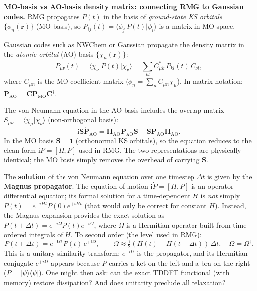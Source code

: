 \documentclass[12pt,letterpaper]{article}
\newcommand{\ii}{\mathrm{i}}
\theoremstyle{definition}
\begin{document}
\begin{insight}
\textbf{MO-basis vs AO-basis density matrix: connecting RMG to Gaussian codes.}
RMG propagates $P(t)$ in the basis of \emph{ground-state KS orbitals}
$\{\phi_n(\bm{r})\}$ (MO basis), so $P_{ij}(t) = \langle\phi_j|P(t)|\phi_i\rangle$
is a matrix in MO space.

Gaussian codes such as NWChem or Gaussian propagate the density matrix in
the \emph{atomic orbital} (AO) basis $\{\chi_\mu(\bm{r})\}$:
\begin{equation}
  P_{\mu\nu}(t) = \langle\chi_\nu|P(t)|\chi_\mu\rangle
  = \sum_{kl} C_{\mu k}^*\,P_{kl}(t)\,C_{\nu l},
  \label{eq:P_AO_MO}
\end{equation}
where $C_{\mu n}$ is the MO coefficient matrix ($\phi_n = \sum_\mu C_{\mu n}\chi_\mu$).
In matrix notation: $\bm{P}_\text{AO} = \bm{C}\bm{P}_\text{MO}\bm{C}^\dagger$.

The von Neumann equation in the AO basis includes the overlap matrix
$S_{\mu\nu} = \langle\chi_\mu|\chi_\nu\rangle$ (non-orthogonal basis):
\begin{equation}
  \ii\bm{S}\dot{\bm{P}}_\text{AO} = \bm{H}_\text{AO}\bm{P}_\text{AO}\bm{S}
                                   - \bm{S}\bm{P}_\text{AO}\bm{H}_\text{AO}.
\end{equation}
In the MO basis $\bm{S} = \bm{1}$ (orthonormal KS orbitals), so the
equation reduces to the clean form $\ii\dot{P} = [H,P]$ used in RMG.
The two representations are physically identical; the MO basis simply
removes the overhead of carrying $\bm{S}$.
\end{insight}

The \textbf{solution} of the von Neumann equation over one timestep $\Delta t$
is given by the \textbf{Magnus propagator}.
The equation of motion $\ii\dot{P} = [H,P]$ is an operator differential
equation; its formal solution for a time-dependent $H$ is \emph{not} simply
$P(t) = e^{-iHt}P(0)e^{+iHt}$ (that would only be correct for constant $H$).
Instead, the Magnus expansion provides the exact solution as
$P(t+\Delta t) = e^{-i\Omega}P(t)e^{+i\Omega}$, where $\Omega$ is
a Hermitian operator built from time-ordered integrals of $H$.
To second order (the level used in RMG):
\begin{equation}
  P(t+\Delta t) = e^{-\ii\Omega}\,P(t)\,e^{+\ii\Omega}, \qquad
  \Omega \approx \tfrac{1}{2}(H(t)+H(t+\Delta t))\,\Delta t,
  \quad \Omega = \Omega^\dagger.
  \label{eq:magnus}
\end{equation}
This is a unitary similarity transform: $e^{-i\Omega}$ is the propagator,
and its Hermitian conjugate $e^{+i\Omega}$ appears because $P$ carries
a ket on the left and a bra on the right ($P = |\psi\rangle\langle\psi|$).  One might then ask: can the
exact TDDFT functional (with memory) restore dissipation?  And does
unitarity preclude all relaxation?
\end{document}
